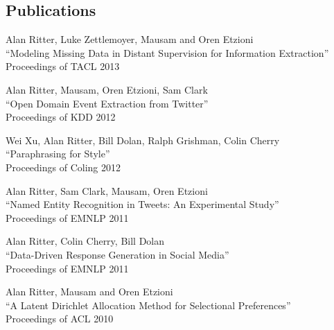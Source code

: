 \documentclass[margin,line]{res}
\begin{document}
\begin{resume}
\begin{comment}
Program Committee \emph{Workshop on Analyzing Microtext 2011}
\vspace*{-2.5mm}

Program Committee \emph{Workshop on Relational Models of Semantics 2011}
\vspace*{-2.5mm}

Program Committee \emph{Workshop on Information Extraction and Knowledge Acquisition 2011}
\vspace*{-2.5mm}

Program Committee \emph{EMNLP 2010}
\vspace*{-2.5mm}

Reviewer \emph{AAAI 2010}
\vspace*{-2.5mm}

Reviewer \emph{UIST 2009}
\vspace*{-2.5mm}

Prospective Graduate Student Committee, \emph{University of Washington} 2010
\end{comment}

\section{\sc Publications}
Alan Ritter, Luke Zettlemoyer, Mausam and Oren Etzioni \\
``Modeling Missing Data in Distant Supervision for Information Extraction''\\
Proceedings of TACL 2013

Alan Ritter, Mausam, Oren Etzioni, Sam Clark \\
``Open Domain Event Extraction from Twitter''\\
Proceedings of KDD 2012

Wei Xu, Alan Ritter, Bill Dolan, Ralph Grishman, Colin Cherry \\
``Paraphrasing for Style''\\
Proceedings of Coling 2012

Alan Ritter, Sam Clark, Mausam, Oren Etzioni \\
``Named Entity Recognition in Tweets: An Experimental Study''\\
Proceedings of EMNLP 2011

Alan Ritter, Colin Cherry, Bill Dolan \\
``Data-Driven Response Generation in Social Media'' \\
Proceedings of EMNLP 2011

Alan Ritter, Mausam and Oren Etzioni \\
``A Latent Dirichlet Allocation Method for Selectional Preferences'' \\
Proceedings of ACL 2010


\end{resume}
\end{document}
